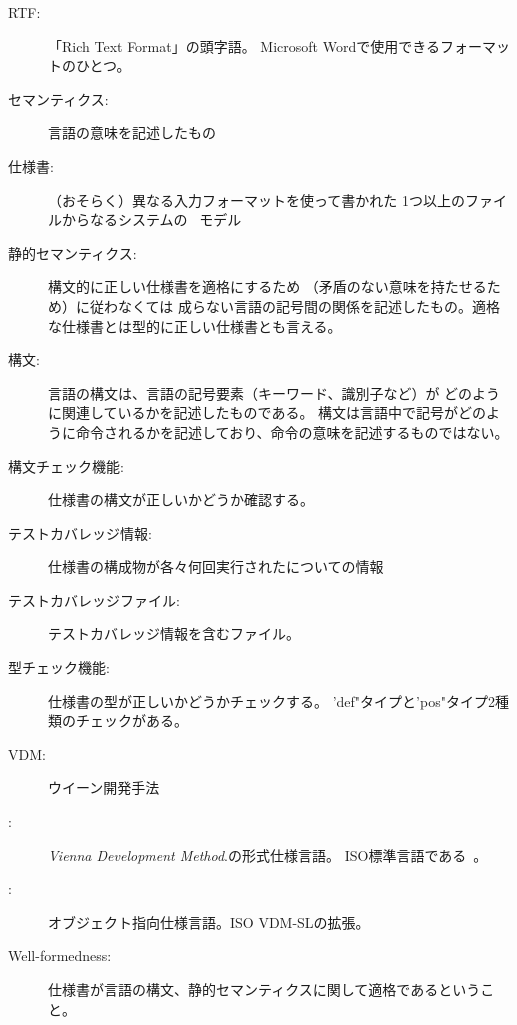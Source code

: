 \begin{description}
\item[RTF:] 「Rich Text Format」の頭字語。
  Microsoft Wordで使用できるフォーマットのひとつ。


\item[セマンティクス:] 言語の意味を記述したもの

  
\item[仕様書:] （おそらく）異なる入力フォーマットを使って書かれた
  1つ以上のファイルからなるシステムの \vdmslpp\ モデル
  

\item[静的セマンティクス:] 構文的に正しい仕様書を適格にするため
  （矛盾のない意味を持たせるため）に従わなくては
  成らない言語の記号間の関係を記述したもの。適格な仕様書とは型的に正しい仕様書とも言える。


\item[構文:] 言語の構文は、言語の記号要素（キーワード、識別子など）が
  どのように関連しているかを記述したものである。
  構文は言語中で記号がどのように命令されるかを記述しており、命令の意味を記述するものではない。


\item[構文チェック機能:] 仕様書の構文が正しいかどうか確認する。

  
\item[テストカバレッジ情報:] 仕様書の構成物が各々何回実行されたについての情報
  
  
\item[テストカバレッジファイル:] テストカバレッジ情報を含むファイル。
  

\item[型チェック機能:] 仕様書の型が正しいかどうかチェックする。
  'def"タイプと'pos"タイプ2種類のチェックがある。


\item[VDM:] ウイーン開発手法


\item[\vdmsl:] {\em Vienna Development Method}.の形式仕様言語。
  ISO標準言語である~\cite{ISOVDM96}。\\


\item[\vdmpp:] オブジェクト指向仕様言語。ISO VDM-SLの拡張。\\


\item[Well-formedness:] 仕様書が言語の構文、静的セマンティクスに関して適格であるということ。

\end{description}
